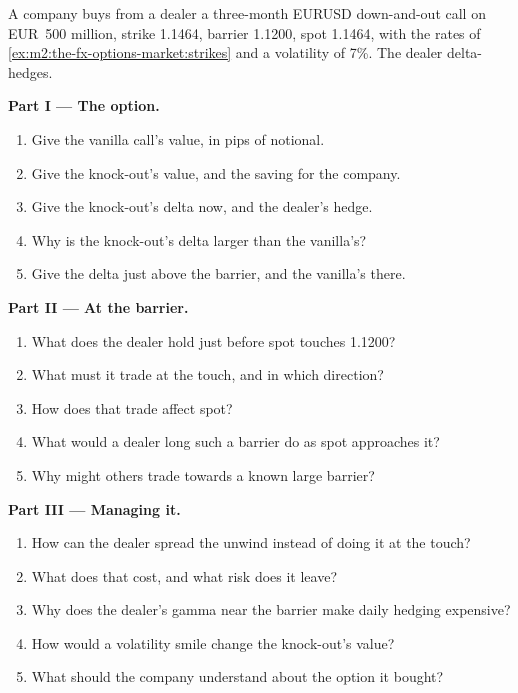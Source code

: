 \begin{problem}\label{pb:m2:the-fx-options-market:1}
A company buys from a dealer a three-month EURUSD down-and-out call on EUR~500
million, strike 1.1464, barrier 1.1200, spot 1.1464, with the rates of
\cref{ex:m2:the-fx-options-market:strikes} and a volatility of 7\%. The dealer
delta-hedges.

\medskip\noindent\textbf{Part I --- The option.}
\begin{enumerate}
\item Give the vanilla call's value, in pips of notional.
\item Give the knock-out's value, and the saving for the company.
\item Give the knock-out's delta now, and the dealer's hedge.
\item Why is the knock-out's delta larger than the vanilla's?
\item Give the delta just above the barrier, and the vanilla's there.
\end{enumerate}

\medskip\noindent\textbf{Part II --- At the barrier.}
\begin{enumerate}[resume]
\item What does the dealer hold just before spot touches 1.1200?
\item What must it trade at the touch, and in which direction?
\item How does that trade affect spot?
\item What would a dealer long such a barrier do as spot approaches it?
\item Why might others trade towards a known large barrier?
\end{enumerate}

\medskip\noindent\textbf{Part III --- Managing it.}
\begin{enumerate}[resume]
\item How can the dealer spread the unwind instead of doing it at the touch?
\item What does that cost, and what risk does it leave?
\item Why does the dealer's gamma near the barrier make daily hedging expensive?
\item How would a volatility smile change the knock-out's value?
\item What should the company understand about the option it bought?
\end{enumerate}


\end{problem}
